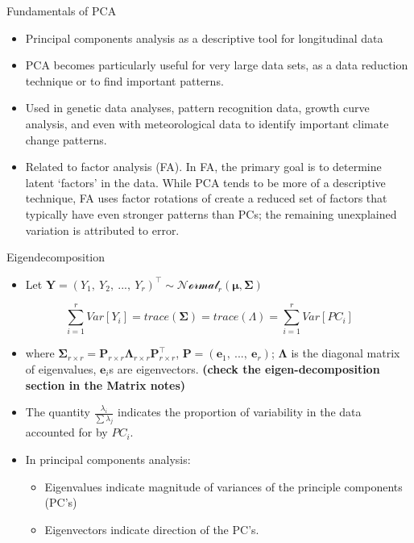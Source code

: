 \documentclass[
  9pt,
  ignorenonframetext,
]{beamer}
\providecommand{\tightlist}{%
  \setlength{\itemsep}{0pt}\setlength{\parskip}{0pt}}
\begin{document}
\begin{frame}{Fundamentals of PCA}
\protect\hypertarget{fundamentals-of-pca}{}
\begin{itemize}
\item
  Principal components analysis as a descriptive tool for longitudinal
  data
\item
  PCA becomes particularly useful for very large data sets, as a data
  reduction technique or to find important patterns.
\item
  Used in genetic data analyses, pattern recognition data, growth curve
  analysis, and even with meteorological data to identify important
  climate change patterns.
\item
  Related to factor analysis (FA). In FA, the primary goal is to
  determine latent `factors' in the data. While PCA tends to be more of
  a descriptive technique, FA uses factor rotations of create a reduced
  set of factors that typically have even stronger patterns than PCs;
  the remaining unexplained variation is attributed to error.
\end{itemize}
\end{frame}

\begin{frame}{Eigendecomposition}
\protect\hypertarget{eigendecomposition}{}
\begin{itemize}
\tightlist
\item
  Let
  \(\pmb Y = (Y_1,\ Y_2,\ ...,\ Y_r)^{\top} \sim \mathcal {Normal}_r(\pmb \mu, \pmb \Sigma)\)
\end{itemize}

\[
\sum_{i=1}^rVar[Y_i] = trace(\pmb \Sigma)
= trace(\Lambda) = \sum^r_{i=1} Var[PC_i]
\]

\begin{itemize}
\item
  where
  \(\pmb \Sigma_{r \times r} = \pmb {P}_{r \times r} \pmb {\Lambda}_{r \times r} \pmb P^{\top}_{r \times r}\),
  \(\pmb P = (\pmb e_1,\ ...,\ \pmb e_r)\); \(\pmb \Lambda\) is the
  diagonal matrix of eigenvalues, \(\pmb e_i\)s are eigenvectors.
  \textbf{(check the eigen-decomposition section in the Matrix notes)}
\item
  The quantity \(\frac {\lambda_i} {\sum \lambda_j}\) indicates the
  proportion of variability in the data accounted for by \(PC_i\).
\item
  In principal components analysis:

  \begin{itemize}
  \item
    Eigenvalues indicate magnitude of variances of the principle
    components (PC's)
  \item
    Eigenvectors indicate direction of the PC's.
  \end{itemize}
\end{itemize}
\end{frame}
\end{document}
